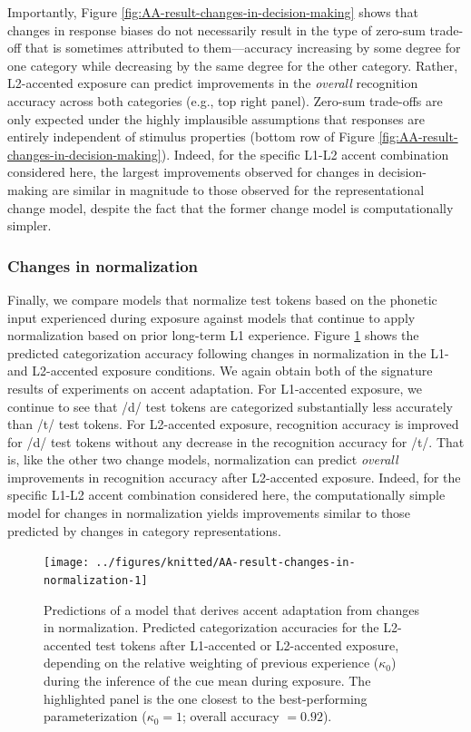 \documentclass[
  11pt,
  man,floatsintext]{apa6}
\begin{document}
Importantly, Figure \ref{fig:AA-result-changes-in-decision-making} shows that changes in response biases do not necessarily result in the type of zero-sum trade-off that is sometimes attributed to them---accuracy increasing by some degree for one category while decreasing by the same degree for the other category. Rather, L2-accented exposure can predict improvements in the \emph{overall} recognition accuracy across both categories (e.g., top right panel). Zero-sum trade-offs are only expected under the highly implausible assumptions that responses are entirely independent of stimulus properties (bottom row of Figure \ref{fig:AA-result-changes-in-decision-making}). Indeed, for the specific L1-L2 accent combination considered here, the largest improvements observed for changes in decision-making are similar in magnitude to those observed for the representational change model, despite the fact that the former change model is computationally simpler.

\subsubsection{Changes in normalization}\label{changes-in-normalization-1}

Finally, we compare models that normalize test tokens based on the phonetic input experienced during exposure against models that continue to apply normalization based on prior long-term L1 experience. Figure \ref{fig:AA-result-changes-in-normalization} shows the predicted categorization accuracy following changes in normalization in the L1- and L2-accented exposure conditions. We again obtain both of the signature results of experiments on accent adaptation. For L1-accented exposure, we continue to see that /d/ test tokens are categorized substantially less accurately than /t/ test tokens. For L2-accented exposure, recognition accuracy is improved for /d/ test tokens without any decrease in the recognition accuracy for /t/. That is, like the other two change models, normalization can predict \emph{overall} improvements in recognition accuracy after L2-accented exposure. Indeed, for the specific L1-L2 accent combination considered here, the computationally simple model for changes in normalization yields improvements similar to those predicted by changes in category representations.



\begin{figure}

{\centering \texttt{[image: ../figures/knitted/AA-result-changes-in-normalization-1]} 

}

\caption{Predictions of a model that derives accent adaptation from changes in normalization. Predicted categorization accuracies for the L2-accented test tokens after L1-accented or L2-accented exposure, depending on the relative weighting of previous experience (\(\kappa_0\)) during the inference of the cue mean during exposure. The highlighted panel is the one closest to the best-performing parameterization (\(\kappa_0 = 1\); overall accuracy \(=0.92\)).}\label{fig:AA-result-changes-in-normalization}
\end{figure}
\end{document}
